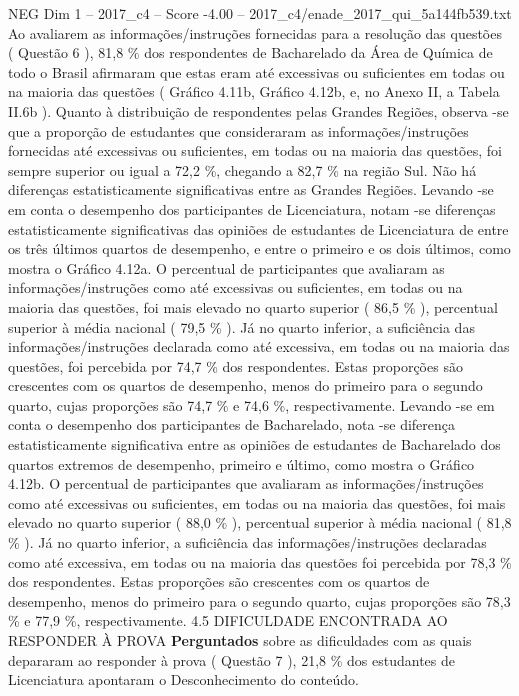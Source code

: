 \begin{textsample}{NEG Dim 1 – 2017\_c4 – Score -4.00 – 2017\_c4/enade\_2017\_qui\_5a144fb539.txt}
Ao avaliarem as informações/instruções fornecidas para a resolução das questões ( Questão 6 ), 81,8 \% dos respondentes de Bacharelado da Área de Química de todo o Brasil afirmaram que estas eram até excessivas ou suficientes em todas ou na maioria das questões ( Gráfico 4.11b, Gráfico 4.12b, e, no Anexo II, a Tabela II.6b ).
Quanto à distribuição de respondentes pelas Grandes Regiões, observa -se que a proporção de estudantes que consideraram as informações/instruções fornecidas até excessivas ou suficientes, em todas ou na maioria das questões, foi sempre superior ou igual a 72,2 \%, chegando a 82,7 \% na região Sul.
Não há diferenças estatisticamente significativas entre as Grandes Regiões.
Levando -se em conta o desempenho dos participantes de Licenciatura, notam -se diferenças estatisticamente significativas das opiniões de estudantes de Licenciatura de entre os três últimos quartos de desempenho, e entre o primeiro e os dois últimos, como mostra o Gráfico 4.12a.
O percentual de participantes que avaliaram as informações/instruções como até excessivas ou suficientes, em todas ou na maioria das questões, foi mais elevado no quarto superior ( 86,5 \% ), percentual superior à média nacional ( 79,5 \% ).
Já no quarto inferior, a suficiência das informações/instruções declarada como até excessiva, em todas ou na maioria das questões, foi percebida por 74,7 \% dos respondentes.
Estas proporções são crescentes com os quartos de desempenho, menos do primeiro para o segundo quarto, cujas proporções são 74,7 \% e 74,6 \%, respectivamente.
Levando -se em conta o desempenho dos participantes de Bacharelado, nota -se diferença estatisticamente significativa entre as opiniões de estudantes de Bacharelado dos quartos extremos de desempenho, primeiro e último, como mostra o Gráfico 4.12b.
O percentual de participantes que avaliaram as informações/instruções como até excessivas ou suficientes, em todas ou na maioria das questões, foi mais elevado no quarto superior ( 88,0 \% ), percentual superior à média nacional ( 81,8 \% ).
Já no quarto inferior, a suficiência das informações/instruções declaradas como até excessiva, em todas ou na maioria das questões foi percebida por 78,3 \% dos respondentes.
Estas proporções são crescentes com os quartos de desempenho, menos do primeiro para o segundo quarto, cujas proporções são 78,3 \% e 77,9 \%, respectivamente. 4.5 DIFICULDADE ENCONTRADA AO RESPONDER À PROVA \textbf{Perguntados} sobre as dificuldades com as quais depararam ao responder à prova ( Questão 7 ), 21,8 \% dos estudantes de Licenciatura apontaram o Desconhecimento do conteúdo.

\end{textsample}

